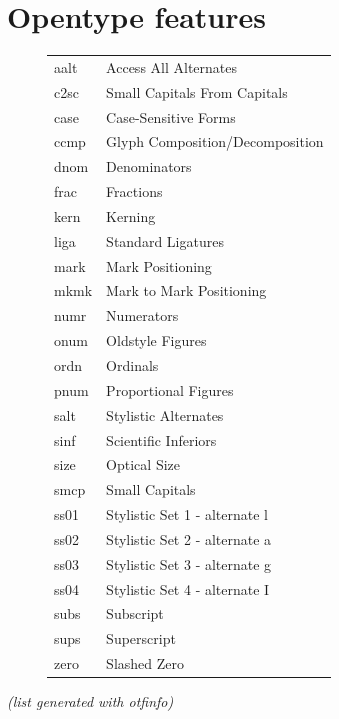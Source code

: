 \documentclass[11pt,a4paper,english]{article}
\begin{document}
\newpage
\section{Opentype features}
\label{sec:otfinfo}

\begin{figure}[ht]
	\centering
	\begin{tabular}{>{\ttfamily}l l}
		aalt & Access All Alternates \\
		c2sc & Small Capitals From Capitals \\
		case & Case-Sensitive Forms \\
		ccmp & Glyph Composition/Decomposition \\
		dnom & Denominators \\
		frac & Fractions \\
		kern & Kerning \\
		liga & Standard Ligatures \\
		mark & Mark Positioning \\
		mkmk & Mark to Mark Positioning \\
		numr & Numerators \\
		onum & Oldstyle Figures \\
		ordn & Ordinals \\
		pnum & Proportional Figures \\
		salt & Stylistic Alternates \\
		sinf & Scientific Inferiors \\
		size & Optical Size \\
		smcp & Small Capitals \\
		ss01 & Stylistic Set 1 - alternate l \\
		ss02 & Stylistic Set 2 - alternate a \\
		ss03 & Stylistic Set 3 - alternate g \\
		ss04 & Stylistic Set 4 - alternate I \\
		subs & Subscript \\
		sups & Superscript \\
		zero & Slashed Zero
	\end{tabular}
\end{figure}
\textit{(list generated with otfinfo)}
\end{document}
